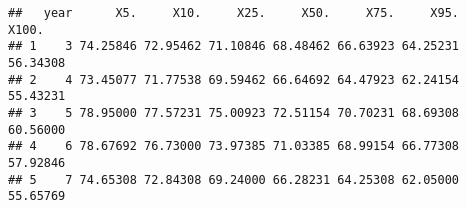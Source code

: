 \documentclass[
]{article}
\newenvironment{Shaded}{\begin{snugshade}}{\end{snugshade}}
\newcommand{\DataTypeTok}[1]{\textcolor[rgb]{0.13,0.29,0.53}{#1}}
\newcommand{\DecValTok}[1]{\textcolor[rgb]{0.00,0.00,0.81}{#1}}
\newcommand{\KeywordTok}[1]{\textcolor[rgb]{0.13,0.29,0.53}{\textbf{#1}}}
\newcommand{\NormalTok}[1]{#1}
\newcommand{\OperatorTok}[1]{\textcolor[rgb]{0.81,0.36,0.00}{\textbf{#1}}}
\newcommand{\StringTok}[1]{\textcolor[rgb]{0.31,0.60,0.02}{#1}}
\begin{document}
\begin{Shaded}
\end{Shaded}

\begin{verbatim}
##   year      X5.     X10.     X25.     X50.     X75.     X95.    X100.
## 1    3 74.25846 72.95462 71.10846 68.48462 66.63923 64.25231 56.34308
## 2    4 73.45077 71.77538 69.59462 66.64692 64.47923 62.24154 55.43231
## 3    5 78.95000 77.57231 75.00923 72.51154 70.70231 68.69308 60.56000
## 4    6 78.67692 76.73000 73.97385 71.03385 68.99154 66.77308 57.92846
## 5    7 74.65308 72.84308 69.24000 66.28231 64.25308 62.05000 55.65769
\end{verbatim}
\end{document}
